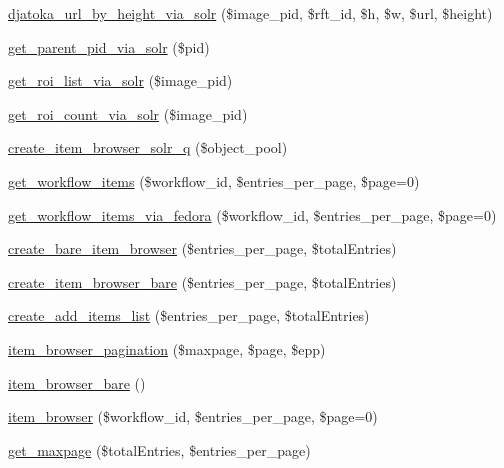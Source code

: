 \begin{DoxyCompactItemize}
\item 
\hyperlink{workspace_8functions_8php_a190c5a6633720455b59a3f8766a6b6f0}{djatoka\_\-url\_\-by\_\-height\_\-via\_\-solr} (\$image\_\-pid, \$rft\_\-id, \$h, \$w, \$url, \$height)
\item 
\hyperlink{workspace_8functions_8php_a2d7495d2abde6025c8af9db740902617}{get\_\-parent\_\-pid\_\-via\_\-solr} (\$pid)
\item 
\hyperlink{workspace_8functions_8php_a9bd79e7f1ee258fbc21969a12ee694c7}{get\_\-roi\_\-list\_\-via\_\-solr} (\$image\_\-pid)
\item 
\hyperlink{workspace_8functions_8php_a85b2bb8ebd4c8259adf1656c4f80b78a}{get\_\-roi\_\-count\_\-via\_\-solr} (\$image\_\-pid)
\item 
\hyperlink{workspace_8functions_8php_a35996c2bae8f203dab6b8cf5c5d3d155}{create\_\-item\_\-browser\_\-solr\_\-q} (\$object\_\-pool)
\item 
\hyperlink{workspace_8functions_8php_a5968cffd7c081d1152d321d4649e50d0}{get\_\-workflow\_\-items} (\$workflow\_\-id, \$entries\_\-per\_\-page, \$page=0)
\item 
\hyperlink{workspace_8functions_8php_a26df2e0d7c88df97768104e8be693005}{get\_\-workflow\_\-items\_\-via\_\-fedora} (\$workflow\_\-id, \$entries\_\-per\_\-page, \$page=0)
\item 
\hyperlink{workspace_8functions_8php_a7874eb316c84c820083eff9624657454}{create\_\-bare\_\-item\_\-browser} (\$entries\_\-per\_\-page, \$totalEntries)
\item 
\hyperlink{workspace_8functions_8php_ab7998174e221c7580b36db79ea435337}{create\_\-item\_\-browser\_\-bare} (\$entries\_\-per\_\-page, \$totalEntries)
\item 
\hyperlink{workspace_8functions_8php_abde27a8b7ead7d9a71ee23d285adf8f0}{create\_\-add\_\-items\_\-list} (\$entries\_\-per\_\-page, \$totalEntries)
\item 
\hyperlink{workspace_8functions_8php_abf61ef625c1650262e4248b4dbd73f2d}{item\_\-browser\_\-pagination} (\$maxpage, \$page, \$epp)
\item 
\hyperlink{workspace_8functions_8php_a3908b51f395452a03e910b8d0654ac70}{item\_\-browser\_\-bare} ()
\item 
\hyperlink{workspace_8functions_8php_a7e08d9faca4b3131d6930a60784f3ef8}{item\_\-browser} (\$workflow\_\-id, \$entries\_\-per\_\-page, \$page=0)
\item 
\hyperlink{workspace_8functions_8php_a03e1829822f4fa388b45fc091af30f02}{get\_\-maxpage} (\$totalEntries, \$entries\_\-per\_\-page)

\end{DoxyCompactItemize}
